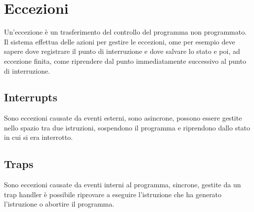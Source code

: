 \section{Eccezioni}
Un'eccezione \`e un trasferimento del controllo del programma non programmato. Il sistema effettua delle azioni per gestire le eccezioni, ome per esempio deve sapere
dove registrare il punto di interruzione e dove salvare lo stato e poi, ad eccezione finita, come riprendere dal punto immediatamente successivo al punto di 
interruzione. 
\subsection{Interrupts}
Sono eccezioni causate da eventi esterni, sono asincrone, possono essere gestite nello spazio tra due istruzioni, sospendono il programma e riprendono dallo stato in
cui si era interrotto. 
\subsection{Traps}
Sono eccezioni causate da eventi interni al programma, sincrone, gestite da un trap handler \`e possibile riprovare a eseguire l'istruzione che ha generato l'istruzione
o abortire il programma. 
